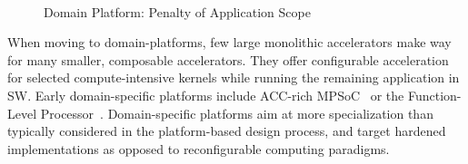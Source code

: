 
\begin{figure}[b]
    \centering
        \\ \vspace{-6pt}
    \caption{Domain Platform: Penalty of Application Scope}
    \label{fig:example}
\end{figure}

When moving to domain-platforms, few large monolithic accelerators make way for many smaller, composable accelerators. They offer 
configurable acceleration for selected compute-intensive kernels while running the remaining application in SW. Early domain-specific platforms include ACC-rich MPSoC~\cite{cong2014accelerator} or the Function-Level Processor~\cite{tabkhi2016function}. Domain-specific platforms aim at more specialization than typically considered in the platform-based design process, and target hardened implementations as opposed to reconfigurable computing  \cite{wildermann2011operational} paradigms.

